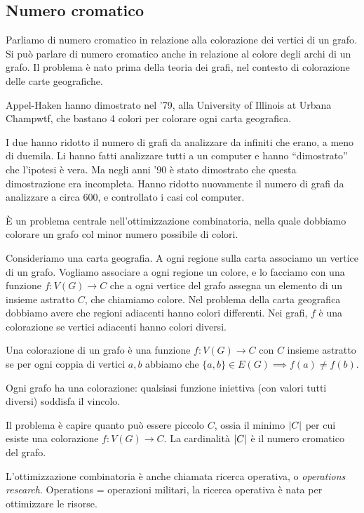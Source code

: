 \subsection{Numero cromatico}

Parliamo di numero cromatico in relazione alla colorazione dei vertici di un grafo.
Si pu\`o parlare di numero cromatico anche in relazione al colore degli archi di un grafo.
Il problema \`e nato prima della teoria dei grafi, nel contesto di colorazione delle carte geografiche.

Appel-Haken hanno dimostrato nel '79, alla University of Illinois at Urbana Champwtf, che bastano 4 colori per colorare ogni carta geografica.

I due hanno ridotto il numero di grafi da analizzare da infiniti che erano, a meno di duemila.
Li hanno fatti analizzare tutti a un computer e hanno ``dimostrato'' che l'ipotesi \`e vera.
Ma negli anni '90 \`e stato dimostrato che questa dimostrazione era incompleta.
Hanno ridotto nuovamente il numero di grafi da analizzare a circa 600, e controllato i casi col computer.

\`E un problema centrale nell'ottimizzazione combinatoria, nella quale dobbiamo colorare un grafo col minor numero possibile di colori.

Consideriamo una carta geografia.
A ogni regione sulla carta associamo un vertice di un grafo.
Vogliamo associare a ogni regione un colore, e lo facciamo con una funzione $f: V(G) \to C$ che a ogni vertice del grafo assegna un elemento di un insieme astratto $C$, che chiamiamo colore.
Nel problema della carta geografica dobbiamo avere che regioni adiacenti hanno colori differenti.
Nei grafi, $f$ \`e una colorazione se vertici adiacenti hanno colori diversi.

\begin{defn}
Una colorazione di un grafo \`e una funzione $f : V(G) \to C$ con $C$ insieme astratto se per ogni coppia di vertici $a,b$ abbiamo che $\{a,b\} \in E(G) \implies f(a) \neq f(b)$.
\end{defn}
Ogni grafo ha una colorazione: qualsiasi funzione iniettiva (con valori tutti diversi) soddisfa il vincolo.

Il problema \`e capire quanto pu\`o essere piccolo $C$, ossia il minimo $\left\lvert{C}\right\rvert$ per cui esiste una colorazione $f : V(G) \to C$.
La cardinalit\`a $\left\lvert{C}\right\rvert$ \`e il numero cromatico del grafo.

L'ottimizzazione combinatoria \`e anche chiamata ricerca operativa, o \emph{operations research}.
Operations = operazioni militari, la ricerca operativa \`e nata per ottimizzare le risorse.

